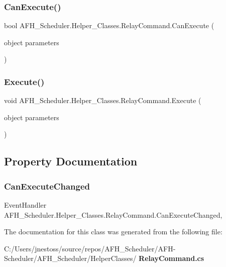 \subsubsection{CanExecute()}
{\footnotesize\ttfamily bool A\+F\+H\+\_\+\+Scheduler.\+Helper\+\_\+\+Classes.\+Relay\+Command.\+Can\+Execute (\begin{DoxyParamCaption}\item[{object}]{parameters }\end{DoxyParamCaption})}

\mbox{\label{class_a_f_h___scheduler_1_1_helper___classes_1_1_relay_command_a6b2a2d71fadd06b09b58c28d71036286}} 
\subsubsection{Execute()}
{\footnotesize\ttfamily void A\+F\+H\+\_\+\+Scheduler.\+Helper\+\_\+\+Classes.\+Relay\+Command.\+Execute (\begin{DoxyParamCaption}\item[{object}]{parameters }\end{DoxyParamCaption})}



\subsection{Property Documentation}
\mbox{\label{class_a_f_h___scheduler_1_1_helper___classes_1_1_relay_command_ab7fc1c75db46185dcdf12e28efa34286}} 
\subsubsection{CanExecuteChanged}
{\footnotesize\ttfamily Event\+Handler A\+F\+H\+\_\+\+Scheduler.\+Helper\+\_\+\+Classes.\+Relay\+Command.\+Can\+Execute\+Changed\hspace{0.3cm}{\ttfamily [add]}, {\ttfamily [remove]}}



The documentation for this class was generated from the following file\+:\begin{DoxyCompactItemize}
\item 
C\+:/\+Users/jnestoss/source/repos/\+A\+F\+H\+\_\+\+Scheduler/\+A\+F\+H-\/\+Scheduler/\+A\+F\+H\+\_\+\+Scheduler/\+Helper\+Classes/\textbf{ Relay\+Command.\+cs}\end{DoxyCompactItemize}
